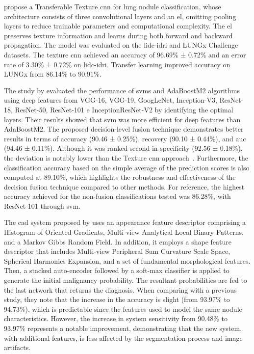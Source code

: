 \textcite{ali_efficient_2020} propose a Transferable Texture \ac{cnn} for lung nodule classification, whose architecture consists of three convolutional layers and an \ac{el}, omitting pooling layers to reduce trainable parameters and computational complexity. The \ac{el} preserves texture information and learns during both forward and backward propagation. The model was evaluated on the \ac{lidc-idri} and LUNGx Challenge datasets. The texture \ac{cnn} achieved an accuracy of 96.69\% ± 0.72\% and an error rate of 3.30\% ± 0.72\% on \ac{lidc-idri}. Transfer learning improved accuracy on LUNGx from 86.14\% to 90.91\%.  

The study by \textcite{ali_deep_2021} evaluated the performance of \acp{svm} and AdaBoostM2 algorithms using deep features from VGG-16, VGG-19, GoogLeNet, Inception-V3, ResNet-18, ResNet-50, ResNet-101 e InceptionResNet-V2 by identifying the optimal layers. Their results showed that \ac{svm} was more efficient for deep features than AdaBoostM2. The proposed decision-level fusion technique demonstrates better results in terms of accuracy (90.46 ± 0.25\%), recovery (90.10 ± 0.44\%), and \ac{auc} (94.46 ± 0.11\%). Although it was ranked second in specificity (92.56 ± 0.18\%), the deviation is notably lower than the Texture \ac{cnn} approach~\cite{ali_efficient_2020}. Furthermore, the classification accuracy based on the simple average of the prediction scores is also computed at 89.10\%, which highlights the robustness and effectiveness of the decision fusion technique compared to other methods. For reference, the highest accuracy achieved for the non-fusion classifications tested was 86.28\%, with ResNet-101 through \ac{svm}.

The \ac{cad} system proposed by \textcite{shaffie_computer-assisted_2022} uses an appearance feature descriptor comprising a Histogram of Oriented Gradients, Multi-view Analytical Local Binary Patterns, and a Markov Gibbs Random Field. In addition, it employs a shape feature descriptor that includes Multi-view Peripheral Sum Curvature Scale Space, Spherical Harmonics Expansion, and a set of fundamental morphological features. Then, a stacked auto-encoder followed by a soft-max classifier is applied to generate the initial malignancy probability. The resultant probabilities are fed to the last network that returns the diagnosis. When comparing with a previous study, they note that the increase in the accuracy is slight (from 93.97\% to 94.73\%), which is predictable since the features used to model the same nodule characteristics. However, the increase in system sensitivity from 90.48\% to 93.97\% represents a notable improvement, demonstrating that the new system, with additional features, is less affected by the segmentation process and image artifacts.

